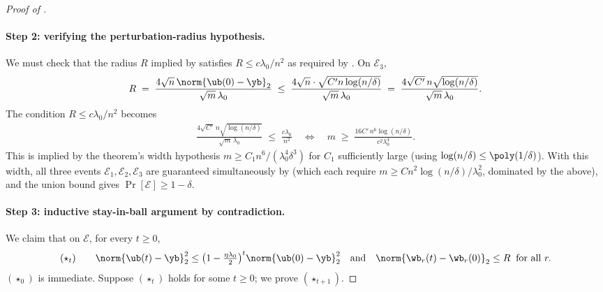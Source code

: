 \begin{proof}[Proof of ]
\paragraph{Step 2: verifying the perturbation-radius hypothesis.}
We must check that the radius $R$ implied by  satisfies $R \le c \lambda_0 / n^2$ as required by . On $\mathcal E_3$,
\begin{align}\label{eq:R_bound}
R
\;=\; \frac{4 \sqrt n \, \norm{\ub(0) - \yb}_2}{\sqrt m \, \lambda_0}
\;\le\; \frac{4 \sqrt n \cdot \sqrt{C' n \log(n/\delta)}}{\sqrt m \, \lambda_0}
\;=\; \frac{4 \sqrt{C'} \, n \sqrt{\log(n/\delta)}}{\sqrt m \, \lambda_0}.
\end{align}
The condition $R \le c \lambda_0 / n^2$ becomes
\begin{align*}
\frac{4 \sqrt{C'} \, n \sqrt{\log(n/\delta)}}{\sqrt m \, \lambda_0} \;\le\; \frac{c \lambda_0}{n^2}
\quad\Longleftrightarrow\quad
m \;\ge\; \frac{16 C' \, n^6 \log(n/\delta)}{c^2 \lambda_0^4}.
\end{align*}
This is implied by the theorem's width hypothesis $m \ge C_1 n^6 / (\lambda_0^4 \delta^3)$ for $C_1$ sufficiently large (using $\log(n/\delta) \le \poly(1/\delta)$). With this width, all three events $\mathcal E_1, \mathcal E_2, \mathcal E_3$ are guaranteed simultaneously by  (which each require $m \ge C n^2 \log(n/\delta) / \lambda_0^2$, dominated by the above), and the union bound gives $\Pr[\mathcal E] \ge 1 - \delta$.

\paragraph{Step 3: inductive stay-in-ball argument by contradiction.}
We claim that on $\mathcal E$, for every $t \ge 0$,
\begin{align}\label{eq:invariant}
(\star_t)
\qquad
\norm{\ub(t) - \yb}_2^2 \le \big( 1 - \tfrac{\eta\lambda_0}{2} \big)^{t} \norm{\ub(0) - \yb}_2^2
\quad\text{and}\quad
\norm{\wb_r(t) - \wb_r(0)}_2 \le R \;\; \text{for all } r.
\end{align}
$(\star_0)$ is immediate. Suppose $(\star_t)$ holds for some $t \ge 0$; we prove $(\star_{t+1})$.


\end{proof}

